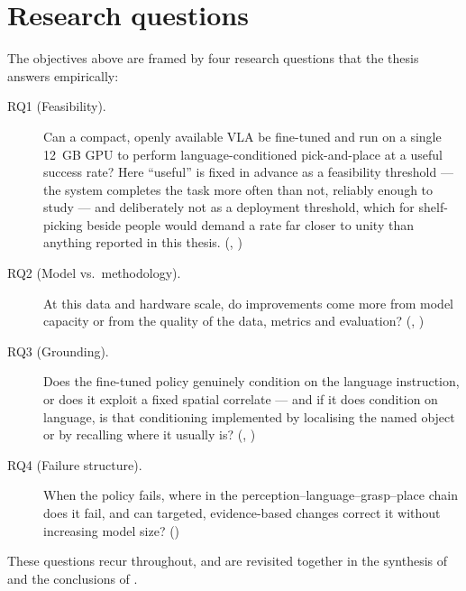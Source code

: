 \section{Research questions}
\label{sec:rqs}
The objectives above are framed by four research questions that the thesis answers
empirically:
\begin{description}
    \item[RQ1 (Feasibility).] Can a compact, openly available VLA be fine-tuned and
    run on a single 12~GB GPU to perform language-conditioned pick-and-place at a
    useful success rate? Here ``useful'' is fixed in advance as a feasibility
    threshold --- the system completes the task more often than not, reliably enough
    to study --- and deliberately not as a deployment threshold, which for
    shelf-picking beside people would demand a rate far closer to unity than anything
    reported in this thesis. (,
    )
    \item[RQ2 (Model vs.\ methodology).] At this data and hardware scale, do
    improvements come more from model capacity or from the quality of the data,
    metrics and evaluation? (, )
    \item[RQ3 (Grounding).] Does the fine-tuned policy genuinely condition on the
    language instruction, or does it exploit a fixed spatial correlate --- and if it
    does condition on language, is that conditioning implemented by localising the
    named object or by recalling where it usually is?
    (, )
    \item[RQ4 (Failure structure).] When the policy fails, where in the
    perception--language--grasp--place chain does it fail, and can targeted,
    evidence-based changes correct it without increasing model size?
    ()
\end{description}
These questions recur throughout, and are revisited together in the synthesis of
 and the conclusions of .


